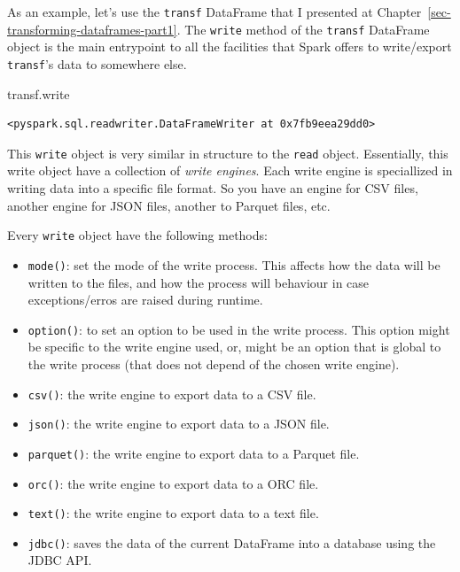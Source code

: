 \documentclass[
  11pt,
  letterpaper,
  DIV=11,
  numbers=noendperiod]{scrreprt}
\newenvironment{Shaded}{\begin{snugshade}}{\end{snugshade}}
\newcommand{\NormalTok}[1]{\textcolor[rgb]{0.00,0.23,0.31}{#1}}
\providecommand{\tightlist}{%
  \setlength{\itemsep}{0pt}\setlength{\parskip}{0pt}}\usepackage{longtable,booktabs,array}
\begin{document}
As an example, let's use the \texttt{transf} DataFrame that I presented
at Chapter~\ref{sec-transforming-dataframes-part1}. The \texttt{write}
method of the \texttt{transf} DataFrame object is the main entrypoint to
all the facilities that Spark offers to write/export \texttt{transf}'s
data to somewhere else.

\begin{Shaded}
\begin{Highlighting}[]
\NormalTok{transf.write}
\end{Highlighting}
\end{Shaded}

\begin{verbatim}
<pyspark.sql.readwriter.DataFrameWriter at 0x7fb9eea29dd0>
\end{verbatim}

This \texttt{write} object is very similar in structure to the
\texttt{read} object. Essentially, this write object have a collection
of \emph{write engines}. Each write engine is speciallized in writing
data into a specific file format. So you have an engine for CSV files,
another engine for JSON files, another to Parquet files, etc.

Every \texttt{write} object have the following methods:

\begin{itemize}
\tightlist
\item
  \texttt{mode()}: set the mode of the write process. This affects how
  the data will be written to the files, and how the process will
  behaviour in case exceptions/erros are raised during runtime.
\item
  \texttt{option()}: to set an option to be used in the write process.
  This option might be specific to the write engine used, or, might be
  an option that is global to the write process (that does not depend of
  the chosen write engine).
\item
  \texttt{csv()}: the write engine to export data to a CSV file.
\item
  \texttt{json()}: the write engine to export data to a JSON file.
\item
  \texttt{parquet()}: the write engine to export data to a Parquet file.
\item
  \texttt{orc()}: the write engine to export data to a ORC file.
\item
  \texttt{text()}: the write engine to export data to a text file.
\item
  \texttt{jdbc()}: saves the data of the current DataFrame into a
  database using the JDBC API.
\end{itemize}
\end{document}
